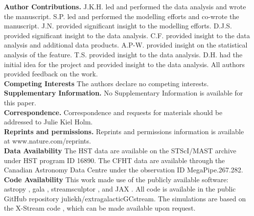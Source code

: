 \documentclass[pdflatex,sn-mathphys-num]{sn-jnl}
\theoremstyle{thmstyleone}
\theoremstyle{thmstyletwo}
\theoremstyle{thmstylethree}
\begin{document}
\noindent \textbf{Author Contributions.}
J.K.H. led and performed the data analysis and wrote the manuscript.
S.P. led and performed the modelling efforts and co-wrote the manuscript.
J.N. provided significant insight to the modelling efforts.
D.J.S. provided significant insight to the data analysis.
C.F. provided insight to the data analysis and additional data products.
A.P-W. provided insight on the statistical analysis of the feature.
T.S. provided insight to the data analysis.
D.H. had the initial idea for the project and provided insight to the data analysis.
All authors provided feedback on the work. \\

\noindent \textbf{Competing Interests} The authors declare no competing interests.\\

\noindent \textbf{Supplementary Information.} No Supplementary Information is available for this paper.\\

\noindent \textbf{Correspondence.} Correspondence and requests for materials should be addressed to Julie Kiel Holm.\\

\noindent \textbf{Reprints and permissions.} Reprints and permissions information is available at www.nature.com/reprints.\\

\noindent \textbf{Data Availability}
The HST data are available on the STScI/MAST archive under HST program ID 16890.
The CFHT data are available through the Canadian Astronomy Data Centre under the observation ID MegaPipe.267.282.\\

\noindent \textbf{Code Availability}
This work made use of the publicly available software: astropy \citep{astropy2018}, gala \citep{gala,adrian_price_whelan_2020_4159870},  streamsculptor \citep{nibauer2025}, and JAX \citep{Jax2018}. All code is available in the public GitHub repository juliekh/extragalacticGCstream. The simulations are based on the X-Stream code \citep{NibPear2025}, which can be made available upon request. \\
\end{document}
